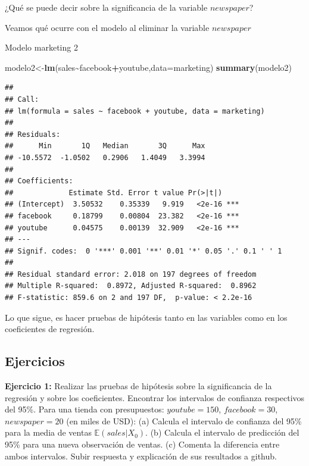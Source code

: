 \documentclass[
]{book}
\newenvironment{Shaded}{\begin{snugshade}}{\end{snugshade}}
\newcommand{\AttributeTok}[1]{\textcolor[rgb]{0.13,0.29,0.53}{#1}}
\newcommand{\FunctionTok}[1]{\textcolor[rgb]{0.13,0.29,0.53}{\textbf{#1}}}
\newcommand{\NormalTok}[1]{#1}
\newcommand{\OtherTok}[1]{\textcolor[rgb]{0.56,0.35,0.01}{#1}}
\newcommand{\SpecialCharTok}[1]{\textcolor[rgb]{0.81,0.36,0.00}{\textbf{#1}}}
\begin{document}
¿Qué se puede decir sobre la significancia de la variable \(newspaper\)?

Veamos qué ocurre con el modelo al eliminar la variable \(newspaper\)

Modelo marketing 2

\begin{Shaded}
\begin{Highlighting}[]
\NormalTok{modelo2}\OtherTok{\textless{}{-}}\FunctionTok{lm}\NormalTok{(sales}\SpecialCharTok{\textasciitilde{}}\NormalTok{facebook}\SpecialCharTok{+}\NormalTok{youtube,}\AttributeTok{data=}\NormalTok{marketing)}
\FunctionTok{summary}\NormalTok{(modelo2)}
\end{Highlighting}
\end{Shaded}

\begin{verbatim}
## 
## Call:
## lm(formula = sales ~ facebook + youtube, data = marketing)
## 
## Residuals:
##      Min       1Q   Median       3Q      Max 
## -10.5572  -1.0502   0.2906   1.4049   3.3994 
## 
## Coefficients:
##             Estimate Std. Error t value Pr(>|t|)    
## (Intercept)  3.50532    0.35339   9.919   <2e-16 ***
## facebook     0.18799    0.00804  23.382   <2e-16 ***
## youtube      0.04575    0.00139  32.909   <2e-16 ***
## ---
## Signif. codes:  0 '***' 0.001 '**' 0.01 '*' 0.05 '.' 0.1 ' ' 1
## 
## Residual standard error: 2.018 on 197 degrees of freedom
## Multiple R-squared:  0.8972, Adjusted R-squared:  0.8962 
## F-statistic: 859.6 on 2 and 197 DF,  p-value: < 2.2e-16
\end{verbatim}

Lo que sigue, es hacer pruebas de hipótesis tanto en las variables como en los coeficientes de regresión.

\subsection{Ejercicios}\label{ejercicios-1}

\textbf{Ejercicio 1:} Realizar las pruebas de hipótesis sobre la significancia de la regresión y sobre los coeficientes. Encontrar los intervalos de confianza respectivos del 95\%.
Para una tienda con presupuestos:
\(youtube = 150\), \(facebook = 30\), \(newspaper=20\) (en miles de USD):
(a) Calcula el intervalo de confianza del 95\% para la media de ventas \(\mathbb{E}(sales | X_0)\).
(b) Calcula el intervalo de predicción del 95\% para una nueva observación de ventas.
(c) Comenta la diferencia entre ambos intervalos.
Subir respuesta y explicación de sus resultados a github.
\end{document}
